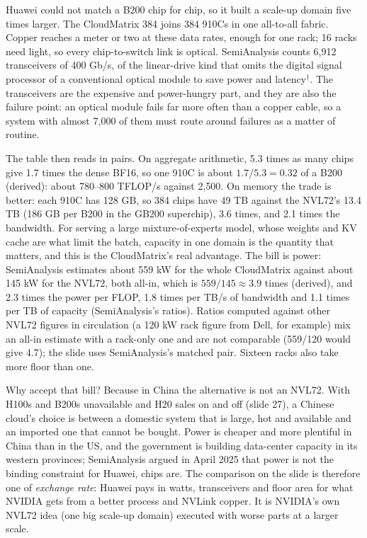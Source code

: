 \documentclass[11pt,letterpaper]{article}
\begin{document}
Huawei could not match a B200 chip for chip, so it built a scale-up domain five times larger. The CloudMatrix 384 joins 384 910Cs in one all-to-all fabric. Copper reaches a meter or two at these data rates, enough for one rack; 16 racks need light, so every chip-to-switch link is optical. SemiAnalysis counts 6{,}912 transceivers of 400 Gb/s, of the linear-drive kind that omits the digital signal processor of a conventional optical module to save power and latency$^\dagger$. The transceivers are the expensive and power-hungry part, and they are also the failure point: an optical module fails far more often than a copper cable, so a system with almost 7{,}000 of them must route around failures as a matter of routine.

The table then reads in pairs. On aggregate arithmetic, 5.3 times as many chips give 1.7 times the dense BF16, so one 910C is about $1.7/5.3 = 0.32$ of a B200 (derived): about 780--800 TFLOP/s against 2{,}500. On memory the trade is better: each 910C has 128 GB, so 384 chips have 49 TB against the NVL72's 13.4 TB (186 GB per B200 in the GB200 superchip), 3.6 times, and 2.1 times the bandwidth. For serving a large mixture-of-experts model, whose weights and KV cache are what limit the batch, capacity in one domain is the quantity that matters, and this is the CloudMatrix's real advantage. The bill is power: SemiAnalysis estimates about 559 kW for the whole CloudMatrix against about 145 kW for the NVL72, both all-in, which is $559/145 \approx 3.9$ times (derived), and 2.3 times the power per FLOP, 1.8 times per TB/s of bandwidth and 1.1 times per TB of capacity (SemiAnalysis's ratios). Ratios computed against other NVL72 figures in circulation (a 120 kW rack figure from Dell, for example) mix an all-in estimate with a rack-only one and are not comparable (559/120 would give 4.7); the slide uses SemiAnalysis's matched pair. Sixteen racks also take more floor than one.

Why accept that bill? Because in China the alternative is not an NVL72. With H100s and B200s unavailable and H20 sales on and off (slide 27), a Chinese cloud's choice is between a domestic system that is large, hot and available and an imported one that cannot be bought. Power is cheaper and more plentiful in China than in the US, and the government is building data-center capacity in its western provinces; SemiAnalysis argued in April 2025 that power is not the binding constraint for Huawei, chips are. The comparison on the slide is therefore one of \emph{exchange rate}: Huawei pays in watts, transceivers and floor area for what NVIDIA gets from a better process and NVLink copper. It is NVIDIA's own NVL72 idea (one big scale-up domain) executed with worse parts at a larger scale.
\end{document}
